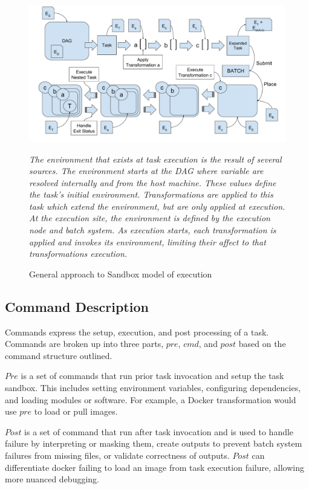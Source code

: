 \documentclass[conference]{IEEEtran}
\begin{document}
\begin{figure}[t]
\includegraphics[width=\textwidth]{graphics/environment_extrapolation_pwrap.pdf}
\caption{General approach to Sandbox model of execution}
\small
\emph{The environment that exists at task execution is
the result of several sources. 
The environment starts at the DAG where 
variable are resolved internally and from the host machine.
These values define the task's initial environment.
Transformations are applied to this task which extend the
environment, but are only applied at execution. 
At the execution site, the environment is
defined by the execution node and batch system.
As execution starts, each transformation is
applied and invokes its environment, limiting 
their affect to that transformations execution.}
\label{figure:env-extrap}
\end{figure}



\subsection{Command Description}

Commands express the setup, execution, and post processing
of a task. 
Commands are broken up into three parts, 
${pre}$, ${cmd}$, and ${post}$
based on the command structure outlined.

${Pre}$ is a set of commands that run prior task invocation
and setup the task sandbox. 
This includes setting environment variables, 
configuring dependencies, and loading modules or software.
For example, a Docker transformation would use ${pre}$ to load or pull images. 

${Post}$ is a set of command that run after task invocation
and is used to 
handle failure by interpreting or masking them,
create outputs to prevent batch system failures from missing files,
or validate correctness of outputs. 
${Post}$ can differentiate 
docker failing to load an image from
task execution failure, 
allowing more nuanced debugging. 
\end{document}
